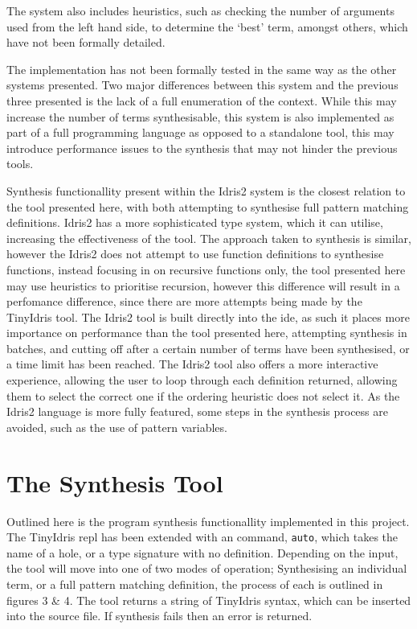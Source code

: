 \documentclass[a4paper]{article}
\begin{document}
The system also includes heuristics, such as checking the number of arguments used from the left hand side, to determine
the `best' term, amongst others, which have not been formally detailed.

The implementation has not been formally tested in the same way as the other systems presented. Two major differences 
between this system and the previous three presented is the lack of a full enumeration of the context. While this may 
increase the number of terms synthesisable, this system is also implemented as part of a full programming language as 
opposed to a standalone tool, this may introduce performance issues to the synthesis that may not hinder the previous 
tools. 

Synthesis functionallity present within the Idris2 system is the closest relation to the tool presented here, with
both attempting to synthesise full pattern matching definitions. Idris2 has a more sophisticated type system, which it
can utilise, increasing the effectiveness of the tool. The approach taken to synthesis is similar, however the Idris2
does not attempt to use function definitions to synthesise functions, instead focusing in on recursive functions only,
the tool presented here may use heuristics to prioritise recursion, however this difference will result in a perfomance
difference, since there are more attempts being made by the TinyIdris tool.
The Idris2 tool is built directly into the ide, as such it places more importance on performance than the tool presented
here, attempting synthesis in batches, and cutting off after a certain number of terms have been synthesised, or a time
limit has been reached. The Idris2 tool also offers a more interactive experience, allowing the user to loop through
each definition returned, allowing them to select the correct one if the ordering heuristic does not select it. As the
Idris2 language is more fully featured, some steps in the synthesis process are avoided, such as the use of pattern variables.


\clearpage

\section{The Synthesis Tool}
\label{sec:org4165c30}

Outlined here is the program synthesis functionallity implemented in
this project. The TinyIdris repl has been extended with an command,
\texttt{auto}, which takes the name of a hole, or a type signature
with no definition. Depending on the input, the tool will move into
one of two modes of operation; Synthesising an individual term, or a
full pattern matching definition, the process of each is outlined in
figures 3 \& 4. The tool returns a string of TinyIdris
syntax, which can be inserted into the source file. If synthesis
fails then an error is returned. 
\end{document}
